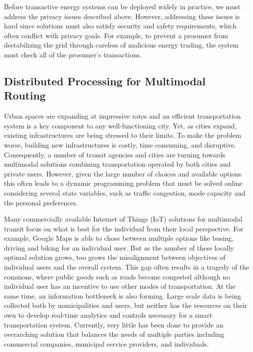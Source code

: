 \documentclass[12pt,letterpaper]{article}
\begin{document}
Before transactive energy systems can be deployed widely in practice,
we must address the privacy issues described above. However, addressing these
issues is hard since solutions must also satisfy security
and safety requirements, which often conflict with privacy goals.  For
example, to prevent a prosumer from destabilizing the grid through
careless of malicious energy trading, the system must check all of the
prosumer's transactions.  

\subsection{Distributed Processing for Multimodal Routing}

Urban spaces are expanding at impressive rates and an efficient transportation system is a key component to any well-functioning city. Yet, as cities expand, existing infrastructures are being stressed to their limits. To make the problem worse,  building new infrastructures is costly, time consuming, and disruptive. Consequently, a number of transit agencies and cities are turning towards multimodal  solutions combining transportation operated by both cities and private users. However, given the large number of choices and available options this often leads to a dynamic programming problem that must be solved online considering several state variables, such as traffic congestion, mode capacity and the personal preferences. 

Many commercially available Internet of Things (IoT) solutions for multimodal
transit focus on what is best for the individual from their local perspective. For example, Google Maps is able to chose between multiple options like busing, driving and biking for an individual user. But as the number of these locally optimal solution grows, too grows the misalignment between objectives of individual users and the overall system. This gap often results in a tragedy of the commons, where public goods such as roads become congested although no individual user has an incentive to use other modes of transportation. At the same time, an information bottleneck is also forming. Large scale data is being collected both by municipalities and users, but neither has the resources on their own to develop real-time analytics and controls necessary for a smart transportation system. Currently, very little has been done to provide an overarching solution that balances the needs of multiple parties including commercial companies, municipal service providers, and individuals.
\end{document}
